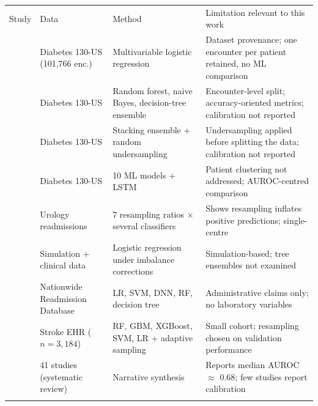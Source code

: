 \begin{tabular}{p{1.7cm}p{2.7cm}p{3.5cm}p{4.0cm}}
\hline\noalign{\smallskip}
Study & Data & Method & Limitation relevant to this work \\
\noalign{\smallskip}\hline\noalign{\smallskip}
\cite{strack2014} & Diabetes 130-US (101,766 enc.) & Multivariable logistic regression & Dataset provenance; one encounter per patient retained, no ML comparison \\
\cite{shang2021} & Diabetes 130-US & Random forest, naive Bayes, decision-tree ensemble & Encounter-level split; accuracy-oriented metrics; calibration not reported \\
\cite{lu2022} & Diabetes 130-US & Stacking ensemble + random undersampling & Undersampling applied before splitting the data; calibration not reported \\
\cite{liu2024} & Diabetes 130-US & 10 ML models + LSTM & Patient clustering not addressed; AUROC-centred comparison \\
\cite{welvaars2023} & Urology readmissions & 7 resampling ratios $\times$ several classifiers & Shows resampling inflates positive predictions; single-centre \\
\cite{goorbergh2022} & Simulation + clinical data & Logistic regression under imbalance corrections & Simulation-based; tree ensembles not examined \\
\cite{amritphale2021} & Nationwide Readmission Database & LR, SVM, DNN, RF, decision tree & Administrative claims only; no laboratory variables \\
\cite{darabi2021} & Stroke EHR ($n=3{,}184$) & RF, GBM, XGBoost, SVM, LR + adaptive sampling & Small cohort; resampling chosen on validation performance \\
\cite{mahmoudi2020} & 41 studies (systematic review) & Narrative synthesis & Reports median AUROC $\approx$ 0.68; few studies report calibration \\
\noalign{\smallskip}\hline
\end{tabular}